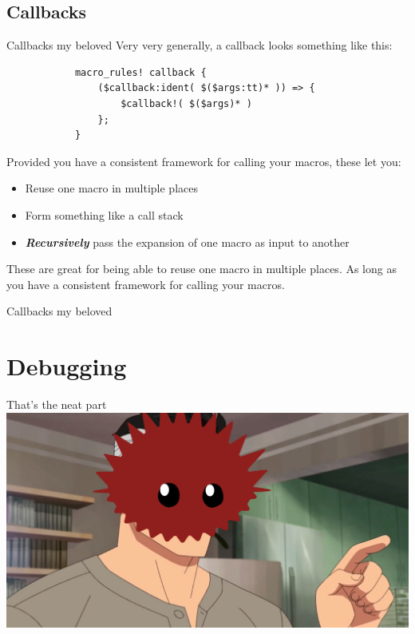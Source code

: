 \documentclass{beamer}
\begin{document}
	\subsection{Callbacks}
	\begin{frame}[fragile]{Callbacks my beloved}
		Very very generally, a callback looks something like this:

		\begin{verbatim}
			macro_rules! callback {
				($callback:ident( $($args:tt)* )) => {
					$callback!( $($args)* )
				};
			}
		\end{verbatim}

		\pause

		Provided you have a consistent framework for calling your macros, these let you:
		\begin{itemize}
			\item Reuse one macro in multiple places
			\item Form something like a call stack
			\item \emph{\textbf{Recursively}} pass the expansion of one macro as input to another
		\end{itemize}

		These are great for being able to reuse one macro in multiple places.\pause{} As long as you have a consistent framework for calling your macros.
	\end{frame}

	\begin{frame}{Callbacks my beloved}

	\end{frame}

	\section{Debugging}
	\begin{frame}{That's the neat part}
		\includegraphics[width = \linewidth]{neat-part.png}
	\end{frame}
\end{document}
